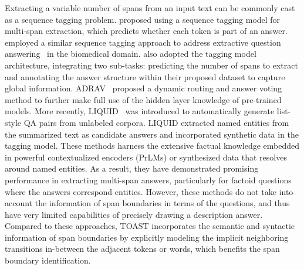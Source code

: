 \documentclass[a4paper,fleqn,twocolumn]{cas-dc}
\newcommand{\1}[1]{\mathds{1}\left[#1\right]}
\begin{document}
Extracting a variable number of spans from an input text can be commonly cast as a sequence tagging problem.
\cite{segal2020simple} proposed using a sequence tagging model for multi-span extraction, which predicts whether each token is part of an answer. \cite{yoon2022} employed a similar sequence tagging approach to address extractive question answering~\citep{DBLP:journals/bmcbi/NaseemDKK22}  in the biomedical domain.
\cite{li2022multispanqa} also adopted the tagging model architecture, integrating two sub-tasks: predicting the number of spans to extract and annotating the answer structure within their proposed dataset to capture global information.
ADRAV~\citep{hu2023biomedical} proposed a dynamic routing and answer voting method to further make full use of the hidden layer knowledge of pre-trained models.
More recently, LIQUID~\citep{lee2023liquid} was introduced to  automatically generate list-style QA pairs from unlabeled corpora. LIQUID extracted named entities from the summarized text as candidate answers and incorporated synthetic data in the tagging model. 
These methods harness the extensive factual knowledge embedded in powerful contextualized encoders (PrLMs) or synthesized data that resolves around named entities. 
As a result, they have demonstrated promising performance in extracting  multi-span answers, particularly for factoid questions where the answers correspond entities.
However, these methods do not take into account the information of span boundaries in terms of the questions, and thus have very limited capabilities of precisely drawing a description answer. 
Compared to these approaches, TOAST incorporates the semantic and syntactic information of span boundaries by explicitly modeling the implicit neighboring transitions in-between the adjacent tokens or words, which benefits the span boundary identification.
\end{document}
